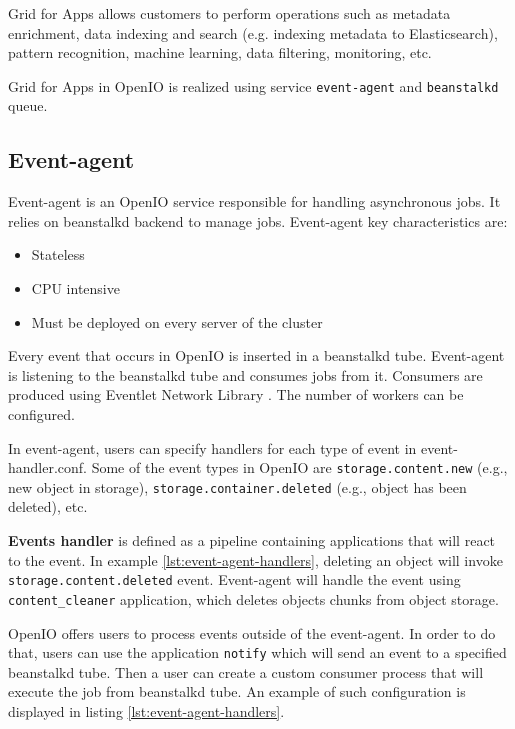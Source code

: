     Grid for Apps allows customers to perform operations such as metadata enrichment, data indexing and search (e.g. indexing metadata to Elasticsearch), pattern recognition, machine learning, data filtering, monitoring, etc\cite{oioNextGen}.

    Grid for Apps in OpenIO is realized using service \texttt{event-agent} and \texttt{beanstalkd} queue.

    \subsection{Event-agent}\label{sec:oioEvent-Agent}
    Event-agent is an OpenIO service responsible for handling asynchronous jobs. It relies on beanstalkd backend to manage jobs. Event-agent key characteristics are\cite{oioSdsServices}:
    \begin{itemize}
        \item Stateless
        \item CPU intensive
        \item Must be deployed on every server of the cluster
    \end{itemize}

    Every event that occurs in OpenIO is inserted in a beanstalkd tube. Event-agent is listening to the beanstalkd tube and consumes jobs from it. Consumers are produced using Eventlet Network Library \cite{oioEventlet}. The number of workers can be configured.

    In event-agent, users can specify handlers for each type of event in event-handler.conf.
    Some of the event types in OpenIO are \texttt{storage.content.new} (e.g., new object in storage), \texttt{storage.container.deleted} (e.g., object has been deleted), etc.

    \textbf{Events handler} is defined as a pipeline containing applications that will react to the event. In example \ref{lst:event-agent-handlers}, deleting an object will invoke \texttt{storage.content.deleted} event. Event-agent will handle the event using \texttt{content\_cleaner} application, which deletes objects chunks from object storage.

    OpenIO offers users to process events outside of the event-agent. In order to do that, users can use the application \texttt{notify} which will send an event to a specified beanstalkd tube. Then a user can create a custom consumer process that will execute the job from beanstalkd tube. An example of such configuration is displayed in listing \ref{lst:event-agent-handlers}.

